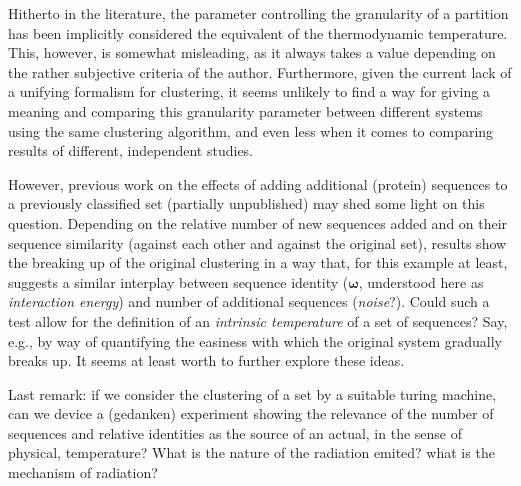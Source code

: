 \documentclass[twocolumn,aps,sort,nofootinbib]{revtex4}
\begin{document}
Hitherto in the literature, the parameter
controlling the granularity of a partition has been implicitly
considered the equivalent of the thermodynamic temperature. This, however,
is somewhat misleading, as it always takes a value depending on the rather
subjective criteria of the author. Furthermore, given the current lack 
of a unifying formalism for clustering, it seems unlikely to 
find a way for giving a meaning and comparing this granularity parameter between different
systems using the same clustering algorithm, and even less when
it comes to comparing results of different, independent studies.

However, previous work
on the effects of adding additional (protein) sequences 
to a previously classified set (partially unpublished)
may shed some light on this question. Depending on the relative number
of new sequences added and on their sequence similarity (against each
other and against the original set), results show the breaking up of the original
clustering in a way that, for this example at least, suggests 
a similar interplay between sequence identity ($\boldsymbol{\omega}$, 
understood here as {\sl interaction energy}) and 
number of additional sequences ({\sl noise}?).
Could such a test allow for the
definition of an {\sl intrinsic temperature} of a set of sequences?
Say, e.g., by way of quantifying the easiness with which the original
system gradually breaks up.
It seems at least worth to further explore these ideas. 

Last remark: if we consider the clustering of a set by a 
suitable turing machine, can we device a (gedanken) experiment
showing the relevance of 
the number of sequences and relative identities as 
the source of an actual, in the sense of physical,  temperature? 
What is the nature of the radiation emited? what is the
mechanism of radiation?

\end{document}
